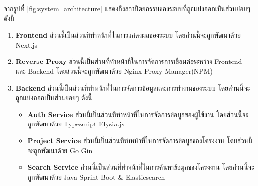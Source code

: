 จากรูปที่ \ref{fig:system_architecture} แสดงถึงสถาปัตยกรรมของระบบที่ถูกแบ่งออกเป็นส่วนย่อยๆ ดังนี้
\begin{enumerate}
  \item  \textbf{Frontend} ส่วนนี้เป็นส่วนที่ทำหน้าที่ในการแสดงผลของระบบ โดยส่วนนี้จะถูกพัฒนาด้วย Next.js
  \item \textbf{Reverse Proxy} ส่วนนี้เป็นส่วนที่ทำหน้าที่ในการจัดการการเชื่อมต่อระหว่าง Frontend และ Backend โดยส่วนนี้จะถูกพัฒนาด้วย Nginx Proxy Manager(NPM)
  \item \textbf{Backend} ส่วนนี้เป็นส่วนที่ทำหน้าที่ในการจัดการข้อมูลและการทำงานของระบบ โดยส่วนนี้จะถูกแบ่งออกเป็นส่วนย่อยๆ ดังนี้
  \begin{itemize}
    \item \textbf{Auth Service} ส่วนนี้เป็นส่วนที่ทำหน้าที่ในการจัดการข้อมูลของผู้ใช้งาน โดยส่วนนี้จะถูกพัฒนาด้วย Typescript Elysia.js 
    \item \textbf{Project Service} ส่วนนี้เป็นส่วนที่ทำหน้าที่ในการจัดการข้อมูลของโครงงาน โดยส่วนนี้จะถูกพัฒนาด้วย Go Gin 
    \item \textbf{Search Service} ส่วนนี้เป็นส่วนที่ทำหน้าที่ในการค้นหาข้อมูลของโครงงาน โดยส่วนนี้จะถูกพัฒนาด้วย Java Sprint Boot \& Elasticsearch
  \end{itemize}
\end{enumerate}

